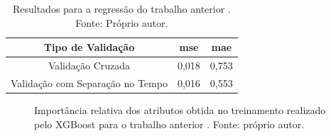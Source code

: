 \begin{table}[h]
\begin{center}
\begin{tabular}{|c|c|c|}
\hline
Tipo de Validação & mse       & mae   \\ \hline
Validação Cruzada                   & 0,018   & 0,753  \\ \hline
Validação com Separação no Tempo    & 0,016   & 0,553  \\ \hline
\end{tabular}
\end{center}
\vspace{12pt}
\caption{Resultados para a regressão do trabalho anterior \cite{REZENDE:2009, REZENDE:2010}. Fonte: Próprio autor.}
\label{tab:results_reg}
\end{table}

\begin{figure}[h]
\center
{}
\caption{Importância relativa dos atributos obtida no treinamento realizado pelo XGBoost para o trabalho anterior \cite{REZENDE:2009, REZENDE:2010}. Fonte: próprio autor.}\label{fig:rego}
\end{figure}

